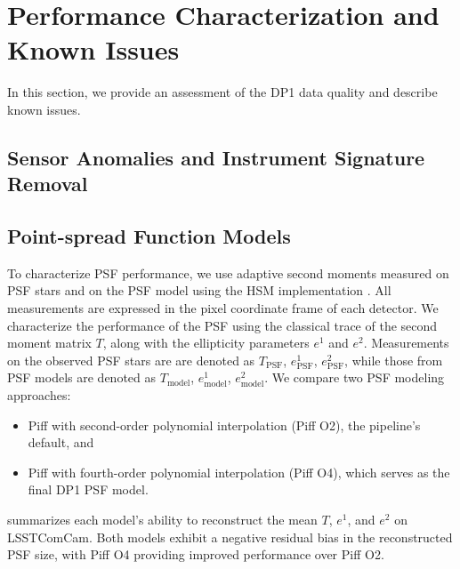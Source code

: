 \section{Performance Characterization and Known Issues}
\label{sec:performance}
%
In this section, we provide an assessment of the \gls{DP1} data quality and describe known issues.

\subsection{Sensor Anomalies and Instrument Signature Removal}
\label{ssec:sensor_anomalies}

%

\subsection{Point-spread Function Models}
\label{ssec:psf_models}
To characterize \gls{PSF}  performance, we use adaptive second moments \citep[][]{2002AJ....123..583B} measured on \gls{PSF} stars and on the PSF model using the \gls{HSM} implementation \citep[][]{2003MNRAS.343..459H, 2005MNRAS.361.1287M}.
All measurements are expressed in the pixel coordinate frame of each detector.
We characterize the performance of the PSF using the classical trace of the  second moment matrix $T$, along with the ellipticity parameters $e^1$ and $e^2$.
Measurements on the observed PSF stars are are denoted as  $T_{\text{PSF}}$, $e^1_{\text{PSF}}$,  $e^2_{\text{PSF}}$, while those from PSF models are denoted as  $T_{\text{model}}$, $e^1_{\text{model}}$, $e^2_{\text{model}}$.
We compare two PSF modeling approaches:
\begin{itemize}
\item Piff with second-order polynomial interpolation (Piff O2), the pipeline's default, and
\item Piff with fourth-order polynomial interpolation (Piff O4), which serves as the final \gls{DP1} PSF model.
\end{itemize}
 summarizes each model’s ability to reconstruct the mean $T$, $e^1$, and $e^2$ on  \gls{LSSTComCam}.
Both models exhibit a negative residual bias in the reconstructed PSF size, with Piff O4 providing improved performance over Piff O2.




